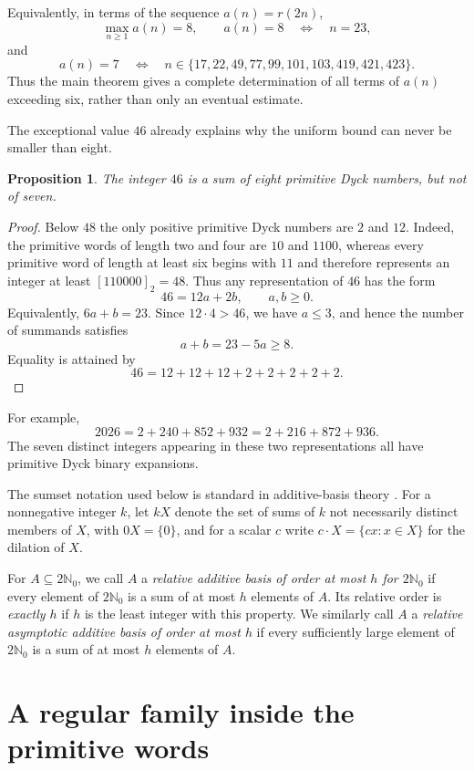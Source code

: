 \documentclass[12pt]{article}
\theoremstyle{plain}
\newtheorem{proposition}[theorem]{Proposition}
\begin{document}
Equivalently, in terms of the sequence $a(n)=r(2n)$,
\[
        \max_{n\geq1}a(n)=8,
        \qquad
        a(n)=8\quad\Longleftrightarrow\quad n=23,
\]
and
\[
 a(n)=7
 \quad\Longleftrightarrow\quad
 n\in\{17,22,49,77,99,101,103,419,421,423\}.
\]
Thus the main theorem gives a complete determination of all terms of
$a(n)$ exceeding six, rather than only an eventual estimate.

The exceptional value $46$ already explains why the uniform bound can
never be smaller than eight.

\begin{proposition}\label{prop:46}
The integer $46$ is a sum of eight primitive Dyck numbers, but not of
seven.
\end{proposition}

\begin{proof}
Below $48$ the only positive primitive Dyck numbers are $2$ and $12$.
Indeed, the primitive words of length two and four are $10$ and $1100$,
whereas every primitive word of length at least six begins with $11$ and
therefore represents an integer at least $[110000]_2=48$.  Thus any
representation of $46$ has the form
\[
        46=12a+2b,\qquad a,b\geq0.
\]
Equivalently, $6a+b=23$.  Since $12\cdot4>46$, we have $a\leq3$, and
hence the number of summands satisfies
\[
        a+b=23-5a\geq8.
\]
Equality is attained by
\[
        46=12+12+12+2+2+2+2+2.
\]
\end{proof}

For example,
\[
 2026=2+240+852+932=2+216+872+936.
\]
The seven distinct integers appearing in these two representations all
have primitive Dyck binary expansions.

The sumset notation used below is standard in additive-basis theory
\cite[Chap.\ 1]{Nathanson}.  For a nonnegative integer $k$, let $kX$ denote the
set of sums of $k$ not necessarily distinct members of $X$, with
$0X=\{0\}$, and for a scalar $c$ write
$c\cdot X=\{cx:x\in X\}$ for the dilation of $X$.

For $A\subseteq2\mathbb N_0$, we call $A$ a \emph{relative additive
basis of order at most $h$ for $2\mathbb N_0$} if every element of
$2\mathbb N_0$ is a sum of at most $h$ elements of $A$.  Its relative
order is \emph{exactly $h$} if $h$ is the least integer with this
property.  We similarly call $A$ a \emph{relative asymptotic additive
basis of order at most $h$} if every sufficiently large element of
$2\mathbb N_0$ is a sum of at most $h$ elements of $A$.  

\section{A regular family inside the primitive words}
\end{document}
